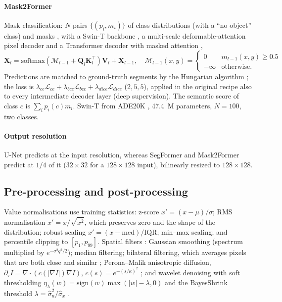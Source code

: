 \documentclass[preprint,12pt,authoryear]{elsarticle}
\begin{document}
\paragraph{Mask2Former} Mask classification: $N$ pairs $\{(p_i,m_i)\}$ of class distributions (with a ``no object'' class) and masks \citep{cheng2021maskformer,carion2020detr}, with a Swin-T backbone \citep{liu2021swin}, a multi-scale deformable-attention pixel decoder \citep{zhu2021deformable} and a Transformer decoder with masked attention \citep{cheng2022mask2former},
\begin{equation}
\mathbf{X}_l=\mathrm{softmax}(\mathcal{M}_{l-1}+\mathbf{Q}_l\mathbf{K}_l^\top)\mathbf{V}_l+\mathbf{X}_{l-1},\quad
\mathcal{M}_{l-1}(x,y)=\begin{cases}0 & m_{l-1}(x,y)\geq 0.5\\ -\infty & \text{otherwise.}\end{cases}
\end{equation}
Predictions are matched to ground-truth segments by the Hungarian algorithm \citep{kuhn1955}; the loss is $\lambda_{ce}\mathcal{L}_{ce}+\lambda_{bce}\mathcal{L}_{bce}+\lambda_{dice}\mathcal{L}_{dice}$ ($2,5,5$), applied in the original recipe also to every intermediate decoder layer (deep supervision). The semantic score of class $c$ is $\sum_i p_i(c)m_i$. Swin-T from ADE20K \citep{zhou2017ade}, 47.4~M parameters, $N=100$, two classes.

\paragraph{Output resolution} U-Net predicts at the input resolution, whereas SegFormer and Mask2Former predict at $1/4$ of it ($32\times32$ for a $128\times128$ input), bilinearly resized to $128\times128$.

\subsection{Pre-processing and post-processing}

Value normalisations use training statistics: z-score $x'=(x-\mu)/\sigma$; RMS normalisation $x'=x/\sqrt{\overline{x^2}}$, which preserves zero and the shape of the distribution; robust scaling $x'=(x-\mathrm{med})/\mathrm{IQR}$; min--max scaling; and percentile clipping to $[p_1,p_{99}]$. Spatial filters \citep{gonzalez2018}: Gaussian smoothing (spectrum multiplied by $e^{-\sigma^2q^2/2}$); median filtering; bilateral filtering, which averages pixels that are both close and similar \citep{tomasi1998}; Perona--Malik anisotropic diffusion, $\partial_\tau I=\nabla\cdot(c(|\nabla I|)\nabla I)$, $c(s)=e^{-(s/\kappa)^2}$ \citep{perona1990}; and wavelet denoising with soft thresholding $\eta_\lambda(w)=\mathrm{sign}(w)\max(|w|-\lambda,0)$ and the BayesShrink threshold $\lambda=\hat\sigma_n^2/\hat\sigma_x$ \citep{donoho1994,chang2000,daubechies1992}.
\end{document}
